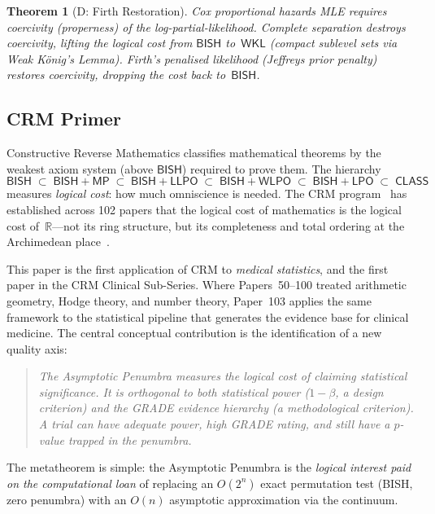 \documentclass[11pt,a4paper]{article}
\theoremstyle{plain}
\newtheorem{theorem}{Theorem}[section]
\theoremstyle{definition}
\newcommand{\BISH}{\textsf{BISH}}
\newcommand{\WKL}{\textsf{WKL}}
\newcommand{\WLPO}{\textsf{WLPO}}
\newcommand{\LLPO}{\textsf{LLPO}}
\newcommand{\LPO}{\textsf{LPO}}
\newcommand{\MP}{\textsf{MP}}
\newcommand{\CLASS}{\textsf{CLASS}}
\newcommand{\R}{\mathbb{R}}
\begin{document}
\begin{theorem}[D: Firth Restoration]\label{thm:D}
Cox proportional hazards MLE requires coercivity (properness) of the log-partial-likelihood.  Complete separation destroys coercivity, lifting the logical cost from $\BISH$ to~$\WKL$ (compact sublevel sets via Weak K\"onig's Lemma).  Firth's penalised likelihood (Jeffreys prior penalty) restores coercivity, dropping the cost back to~$\BISH$.
\end{theorem}

\subsection{CRM Primer}

Constructive Reverse Mathematics classifies mathematical theorems by the weakest axiom system (above $\BISH$) required to prove them.  The hierarchy
\[
  \BISH \;\subset\; \BISH{+}\MP \;\subset\; \BISH{+}\LLPO \;\subset\; \BISH{+}\WLPO \;\subset\; \BISH{+}\LPO \;\subset\; \CLASS
\]
measures \emph{logical cost}: how much omniscience is needed.  The CRM program~\cite{series,lee-format-guide} has established across 102 papers that the logical cost of mathematics is the logical cost of~$\R$---not its ring structure, but its completeness and total ordering at the Archimedean place~\cite{lee-crm-p98}.

This paper is the first application of CRM to \emph{medical statistics}, and the first paper in the CRM Clinical Sub-Series.  Where Papers~50--100 treated arithmetic geometry, Hodge theory, and number theory, Paper~103 applies the same framework to the statistical pipeline that generates the evidence base for clinical medicine.  The central conceptual contribution is the identification of a new quality axis:

\begin{quote}
\emph{The Asymptotic Penumbra measures the logical cost of claiming statistical significance.  It is orthogonal to both statistical power ($1-\beta$, a design criterion) and the GRADE evidence hierarchy (a methodological criterion).  A trial can have adequate power, high GRADE rating, and still have a $p$-value trapped in the penumbra.}
\end{quote}

The metatheorem is simple: the Asymptotic Penumbra is the \emph{logical interest paid on the computational loan} of replacing an $O(2^n)$ exact permutation test (BISH, zero penumbra) with an $O(n)$ asymptotic approximation via the continuum.
\end{document}

